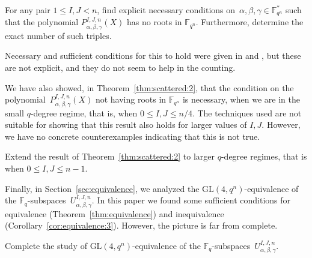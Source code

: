 \begin{ques} For any pair $1\leq I,J<n $, find explicit necessary conditions on~$\alpha,\beta,\gamma\in{\mathbb F}_{q^n}^*$ such that the polynomial $P_{\alpha, \beta, \gamma}^{I,J,n}(X)$ has no roots in ${\mathbb F}_{q^n}$. Furthermore, determine the exact number of such triples.
\end{ques}

Necessary and sufficient conditions for this to hold were given in \cite[Theorem 8]{mcguire2019characterization} and \cite[Theorem 9]{kim2021solving}, but these are not explicit, and they do not seem to help in the counting.

We have also showed, in Theorem~\ref{thm:scattered:2}, that the condition on the polynomial~$P_{\alpha, \beta, \gamma}^{I,J,n}(X)$ not having roots in ${\mathbb F}_{q^n}$ is necessary, when we are in the small $q$-degree regime, that is, when $0\leq I,J\leq n/4$. The techniques used are not suitable for showing that this result also holds for larger values of $I,J$. However, we have no concrete counterexamples indicating that this is not true.

\begin{ques} Extend the result of Theorem~\ref{thm:scattered:2} to larger $q$-degree regimes, that is when $0\leq I,J\leq n-1$. 
\end{ques}

Finally, in Section~\ref{sec:equivalence}, we analyzed the $\textrm{GL}(4,q^n)$-equivalence of the $\mathbb{F}_q$-subspaces~$U_{\alpha, \beta, \gamma}^{I,J,n}$. In this paper we found some sufficient conditions for equivalence (Theorem~\ref{thm:equivalence}) and inequivalence (Corollary~\ref{cor:equivalence:3}). However, the picture is far from complete.

\begin{ques}
 Complete the study of $\textrm{GL}(4,q^n)$-equivalence of the  $\mathbb{F}_q$-subspaces~$U_{\alpha, \beta, \gamma}^{I,J,n}$.
\end{ques}
